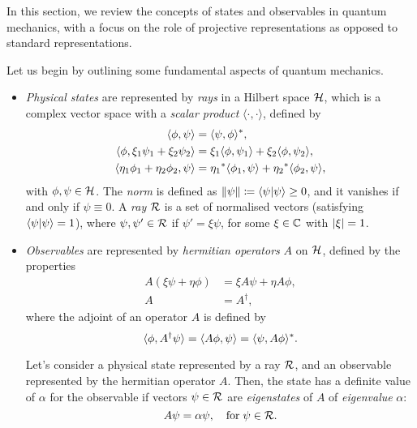 In this section, we review the concepts of states and observables in quantum mechanics, with a focus on the role of projective representations as opposed to standard representations.

Let us begin by outlining some fundamental aspects of quantum mechanics.
\begin{itemize}
    \item \emph{Physical states} are represented by \emph{rays} in a Hilbert space $\mathcal{H}$, which is a complex vector space with a \emph{scalar product} $\langle \cdot, \cdot \rangle$, defined by
    \begin{subequations}\label{eq:scalar-product}
        \begin{align}
        \langle \phi, \psi \rangle &= \langle \psi, \phi \rangle^* , \\
        \langle \phi, \xi_1 \psi_1 + \xi_2 \psi_2 \rangle &= \xi_1 \langle \phi, \psi_1 \rangle + \xi_2 \langle \phi, \psi_2 \rangle ,\\
        \langle \eta_1 \phi_1 + \eta_2 \phi_2, \psi \rangle &= {\eta_1}^* \langle \phi_1, \psi \rangle + {\eta_2}^* \langle \phi_2, \psi \rangle ,
        \end{align}
        \end{subequations}
    with $\phi,\psi \in \mathcal{H}$. The \emph{norm} is defined as $\lVert\psi\rVert \coloneq \braket{\psi}{\psi} \geq 0$, and it vanishes if and only if $\psi \equiv 0$. A \emph{ray} $\mathcal{R}$ is a set of normalised vectors (satisfying $\braket{\psi}{\psi} = 1$), where $\psi, \psi' \in \mathcal{R}$ if $\psi' = \xi \psi$, for some $\xi \in \mathbb{C}$ with $\abs{\xi} = 1$.
    \item \emph{Observables} are represented by \emph{hermitian operators} $A$ on $\mathcal{H}$, defined by the properties
    \begin{subequations}
    \begin{align}
        A (\xi \psi + \eta \phi) &= \xi A\psi + \eta A \phi ,\\
        A &= A^\dagger ,
    \end{align}
    \end{subequations}
    where the adjoint of an operator $A$ is defined by
    \begin{equation}\label{eq:def-adjoint}
        \langle \phi, A^\dagger \psi \rangle = \langle A\phi, \psi \rangle = \langle \psi, A\phi \rangle^* .
    \end{equation}

    Let's consider a physical state represented by a ray $\mathcal{R}$, and an observable represented by the hermitian operator $A$. Then, the state has a definite value of $\alpha$ for the observable if vectors $\psi \in \mathcal{R}$ are \emph{eigenstates} of $A$ of \emph{eigenvalue} $\alpha$:
    \begin{equation}
        A\psi = \alpha \psi, \quad \textup{for} \; \psi \in \mathcal{R} .
    \end{equation}


\end{itemize}
